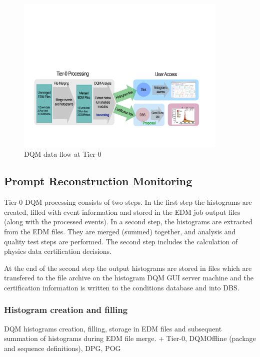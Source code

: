 
\begin{figure}[!htbp]
\begin{center}
\includegraphics[width=0.9\textwidth]{dqm_tier0}
\caption{DQM data flow at Tier-0}
\end{center}
\label{fig:dqmoffline}
\end{figure}


\subsection{Prompt Reconstruction Monitoring}


Tier-0 DQM processing consists of two steps. In the first step
the histograms are created, filled with event information and stored 
in the EDM job output files (along with the processed events).
In a second step, the histograms are extracted from the EDM files.
They are merged (summed) together, and analysis and
quality test steps are performed. The second step includes
the calculation of physics data certification decisions.

At the end of the second step the output histograms are stored in files 
which are transfered to the file archive on the histogram DQM GUI server machine
and the certification information is written to the conditions database and into DBS.

\subsubsection{Histogram creation and filling}

DQM histograms creation, filling, storage in EDM files 
and subsequent summation of histograms during EDM file merge.
            + Tier-0, DQMOffline (package and sequence definitions), DPG, POG

